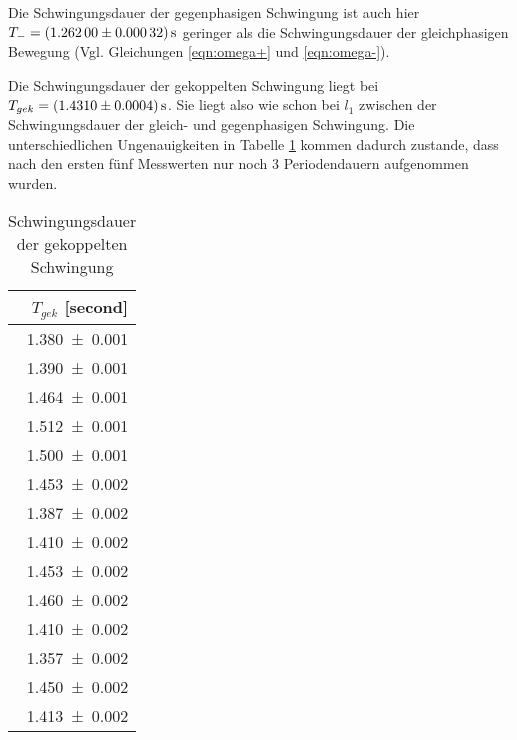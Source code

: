 Die Schwingungsdauer der gegenphasigen Schwingung ist auch hier
$T_-=\SI{1.262+-0.00032}{\second}$ geringer
als die Schwingungsdauer der gleichphasigen Bewegung
(Vgl. Gleichungen \ref{eqn:omega+} und \ref{eqn:omega-}).

Die Schwingungsdauer der gekoppelten Schwingung liegt bei
$T_{gek} = \SI{1.431+-0.0004}{\second}$. Sie liegt also wie schon bei $l_1$
zwischen der Schwingungsdauer der gleich- und gegenphasigen Schwingung.
Die unterschiedlichen Ungenauigkeiten in Tabelle \ref{tab:l2tgek} kommen dadurch
zustande, dass nach den ersten fünf Messwerten nur noch 3 Periodendauern
aufgenommen wurden.
\begin{table}[H]
 \centering
 \caption{Schwingungsdauer der gekoppelten
 Schwingung}
 \label{tab:l2tgek}
 \begin{tabular}{r}
 \toprule
  {$T_{gek}$ [\si{second}]} \\
 \midrule
    \num{1.380 +- 0.001}\\
    \num{1.390 +- 0.001}\\
    \num{1.464 +- 0.001}\\
    \num{1.512 +- 0.001}\\
    \num{1.500 +- 0.001}\\
    \num{1.453 +- 0.002}\\
    \num{1.387 +- 0.002}\\
    \num{1.410 +- 0.002}\\
    \num{1.453 +- 0.002}\\
    \num{1.460 +- 0.002}\\
    \num{1.410 +- 0.002}\\
    \num{1.357 +- 0.002}\\
    \num{1.450 +- 0.002}\\
    \num{1.413 +- 0.002}\\
 \bottomrule
 \end{tabular}
\end{table}

